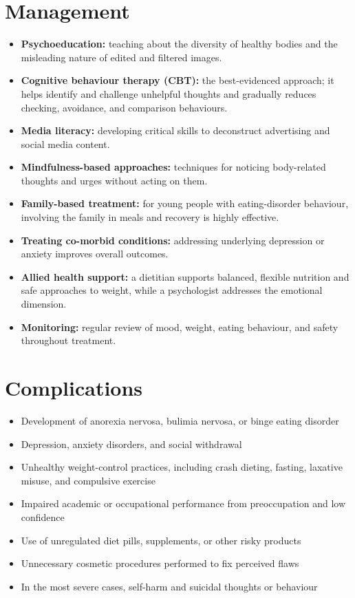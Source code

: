 \section*{Management}
\begin{itemize}
    \item \textbf{Psychoeducation:} teaching about the diversity of healthy bodies and the misleading nature of edited and filtered images.
    \item \textbf{Cognitive behaviour therapy (CBT):} the best-evidenced approach; it helps identify and challenge unhelpful thoughts and gradually reduces checking, avoidance, and comparison behaviours.
    \item \textbf{Media literacy:} developing critical skills to deconstruct advertising and social media content.
    \item \textbf{Mindfulness-based approaches:} techniques for noticing body-related thoughts and urges without acting on them.
    \item \textbf{Family-based treatment:} for young people with eating-disorder behaviour, involving the family in meals and recovery is highly effective.
    \item \textbf{Treating co-morbid conditions:} addressing underlying depression or anxiety improves overall outcomes.
    \item \textbf{Allied health support:} a dietitian supports balanced, flexible nutrition and safe approaches to weight, while a psychologist addresses the emotional dimension.
    \item \textbf{Monitoring:} regular review of mood, weight, eating behaviour, and safety throughout treatment.
\end{itemize}

\section*{Complications}
\begin{itemize}
    \item Development of anorexia nervosa, bulimia nervosa, or binge eating disorder
    \item Depression, anxiety disorders, and social withdrawal
    \item Unhealthy weight-control practices, including crash dieting, fasting, laxative misuse, and compulsive exercise
    \item Impaired academic or occupational performance from preoccupation and low confidence
    \item Use of unregulated diet pills, supplements, or other risky products
    \item Unnecessary cosmetic procedures performed to fix perceived flaws
    \item In the most severe cases, self-harm and suicidal thoughts or behaviour
\end{itemize}

